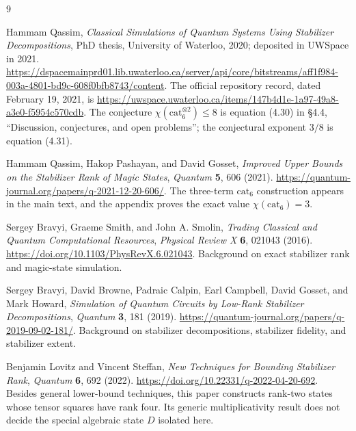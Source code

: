 \documentclass[11pt]{article}
\theoremstyle{definition}
\newcommand{\cat}{\mathrm{cat}}
\begin{document}
\begin{thebibliography}{9}

Hammam Qassim,
\emph{Classical Simulations of Quantum Systems Using Stabilizer Decompositions},
PhD thesis, University of Waterloo, 2020; deposited in UWSpace in 2021.
\url{https://dspacemainprd01.lib.uwaterloo.ca/server/api/core/bitstreams/aff1f984-003a-4801-bd9c-608f0bfb8743/content}.
The official repository record, dated February 19, 2021, is
\url{https://uwspace.uwaterloo.ca/items/147b4d1e-1a97-49a8-a3e0-f5954c570cdb}.
The conjecture $\chi(\cat_6^{\otimes2})\leq8$ is equation (4.30) in \S4.4, ``Discussion, conjectures, and open problems''; the conjectural exponent $3/8$ is equation (4.31).

Hammam Qassim, Hakop Pashayan, and David Gosset,
\emph{Improved Upper Bounds on the Stabilizer Rank of Magic States},
\emph{Quantum} \textbf{5}, 606 (2021).
\url{https://quantum-journal.org/papers/q-2021-12-20-606/}.
The three-term $\cat_6$ construction appears in the main text, and the appendix proves the exact value $\chi(\cat_6)=3$.

Sergey Bravyi, Graeme Smith, and John A. Smolin,
\emph{Trading Classical and Quantum Computational Resources},
\emph{Physical Review X} \textbf{6}, 021043 (2016).
\url{https://doi.org/10.1103/PhysRevX.6.021043}.
Background on exact stabilizer rank and magic-state simulation.

Sergey Bravyi, David Browne, Padraic Calpin, Earl Campbell, David Gosset, and Mark Howard,
\emph{Simulation of Quantum Circuits by Low-Rank Stabilizer Decompositions},
\emph{Quantum} \textbf{3}, 181 (2019).
\url{https://quantum-journal.org/papers/q-2019-09-02-181/}.
Background on stabilizer decompositions, stabilizer fidelity, and stabilizer extent.

Benjamin Lovitz and Vincent Steffan,
\emph{New Techniques for Bounding Stabilizer Rank},
\emph{Quantum} \textbf{6}, 692 (2022).
\url{https://doi.org/10.22331/q-2022-04-20-692}.
Besides general lower-bound techniques, this paper constructs rank-two states whose tensor squares have rank four. Its generic multiplicativity result does not decide the special algebraic state $D$ isolated here.

\end{thebibliography}
\end{document}
